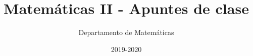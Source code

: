 \documentclass[nobuilddate,nochap]{Docencia}
\title{Matemáticas II - Apuntes de clase}
\author{Departamento de Matemáticas}
\date{2019-2020}
\begin{document}
\pagestyle{plain}
\maketitle
\tableofcontents
\newpage

\newcommand{\hide}[1]{#1}

\renewcommand{\vec}[1]{\overrightarrow{#1}}



    
    

    




%
%



%

\newpage
\printindex
\listoffigures
\listoftables
\end{document}

